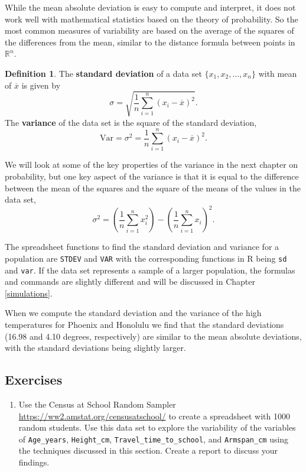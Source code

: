 \documentclass[
]{book}
\providecommand{\tightlist}{%
  \setlength{\itemsep}{0pt}\setlength{\parskip}{0pt}}
\theoremstyle{definition}
\newtheorem{definition}{Definition}[chapter]
\theoremstyle{definition}
\theoremstyle{definition}
\theoremstyle{definition}
\theoremstyle{remark}
\begin{document}
While the mean absolute deviation is easy to compute and interpret, it does not work well with mathematical statistics based on the theory of probability. So the most common measures of variability are based on the average of the squares of the differences from the mean, similar to the distance formula between points in \(\mathbb{R}^n\).

\begin{definition}
The \textbf{standard deviation} of a data set \(\{x_1, x_2, \ldots, x_n\}\) with mean of \(\overline{x}\) is given by \[\sigma =  \sqrt{ \frac{1}{n} \sum_{i=1}^n \left(x_i - \overline{x}\right)^2}.\]
The \textbf{variance} of the data set is the square of the standard deviation,
\[\mathrm{Var} = \sigma^2 = \frac{1}{n} \sum_{i=1}^n \left(x_i - \overline{x}\right)^2.\]
\end{definition}

We will look at some of the key properties of the variance in the next chapter on probability, but one key aspect of the variance is that it is equal to the difference between the mean of the squares and the square of the means of the values in the data set,
\[\sigma^2 = \left(\frac{1}{n} \sum_{i=1}^n x_i^2\right) - \left( \frac{1}{n} \sum_{i=1}^n x_i \right)^2.\]

The spreadsheet functions to find the standard deviation and variance for a population are \texttt{STDEV} and \texttt{VAR} with the corresponding functions in R being \texttt{sd} and \texttt{var}. If the data set represents a sample of a larger population, the formulas and commands are slightly different and will be discussed in Chapter \ref{simulations}.

When we compute the standard deviation and the variance of the high temperatures for Phoenix and Honolulu we find that the standard deviations (16.98 and 4.10 degrees, respectively) are similar to the mean absolute deviations, with the standard deviations being slightly larger.

\hypertarget{exercises-64}{%
\subsection{Exercises}\label{exercises-64}}

\begin{enumerate}
\def\labelenumi{\arabic{enumi}.}
\tightlist
\item
  Use the Census at School Random Sampler \url{https://ww2.amstat.org/censusatschool/} to create a spreadsheet with 1000 random students. Use this data set to explore the variability of the variables of \texttt{Age\_years}, \texttt{Height\_cm}, \texttt{Travel\_time\_to\_school}, and \texttt{Armspan\_cm} using the techniques discussed in this section. Create a report to discuss your findings.
\end{enumerate}
\end{document}
